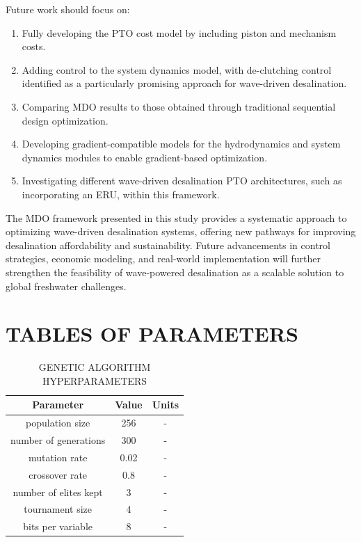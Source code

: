 \documentclass[twocolumn,10pt]{asme2e}
\begin{document}
Future work should focus on:
\begin{enumerate}
    \item Fully developing the PTO cost model by including piston and mechanism costs.
    \item Adding control to the system dynamics model, with de-clutching control \cite{Ringwood2014} identified as a particularly promising approach for wave-driven desalination.
    \item Comparing MDO results to those obtained through traditional sequential design optimization.
    \item Developing gradient-compatible models for the hydrodynamics and system dynamics modules to enable gradient-based optimization.
    \item Investigating different wave-driven desalination PTO architectures, such as incorporating an ERU, within this framework.
\end{enumerate}

The MDO framework presented in this study provides a systematic approach to optimizing wave-driven desalination systems, offering new pathways for improving desalination affordability and sustainability. Future advancements in control strategies, economic modeling, and real-world implementation will further strengthen the feasibility of wave-powered desalination as a scalable solution to global freshwater challenges.




\appendix
\newpage
\section{TABLES OF PARAMETERS} \label{app:params}

\begin{table}[h]
    \centering
    \caption{GENETIC ALGORITHM HYPERPARAMETERS}
    \begin{tabular}{ccc}
        \hline
        \textbf{Parameter} & \textbf{Value} & \textbf{Units} \\
        \hline
        population size & 256 & - \\
        number of generations & 300 & - \\
        mutation rate & 0.02 & - \\
        crossover rate & 0.8 & - \\
        number of elites kept & 3 & - \\
        tournament size & 4 & - \\
        bits per variable & 8 & - \\ 
        \hline
    \end{tabular}
    \label{tab:paramsga}
\end{table}
\end{document}
